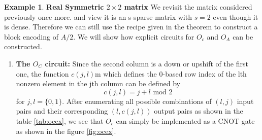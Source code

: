 \documentclass[12pt, oneside]{book}
\theoremstyle{definition}
\theoremstyle{definition}
\newtheorem{example}{Example}[section]
\theoremstyle{remark}
\begin{document}
\begin{example}
    \textbf{Real Symmetric $2 \times 2$ matrix} We revisit the matrix considered previously once more. and view it is an s-sparse matrix with $s=2$ even though it is dense. Therefore we can still use the recipe given in the theorem to construct a block encoding of $A/2$. We will show how explicit circuits for $O_c$ and $O_A$ can be constructed.

    \begin{enumerate}
        \item \textbf{The $O_C$ circuit:} Since the second column is a down or upshift of the first one, the function $c(j,l)$m which defines the 0-based row index of the lth nonzero element in the jth column can be defined by
        \[
        c(j,l)=j+l \text{ mod } 2
        \]
        for $j,l=\{0,1\}$. After enumerating all possible combinations of $(l,j)$ input pairs and their corresponding $(l,c(j,l))$ output pairs as shown in the table \ref{tab:ocex}, we see that $O_c$ can simply be implemented as a CNOT gate as shown in the figure \ref{fig:ocex}.


\end{enumerate}
\end{example}
\end{document}
